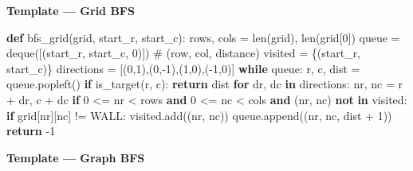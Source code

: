 \documentclass[11pt]{article}
\newenvironment{Shaded}{\begin{snugshade}}{\end{snugshade}}
\newcommand{\BuiltInTok}[1]{\textcolor[rgb]{0.50,0.55,0.55}{#1}}
\newcommand{\CommentTok}[1]{\textcolor[rgb]{0.48,0.49,0.49}{#1}}
\newcommand{\ControlFlowTok}[1]{\textcolor[rgb]{0.99,0.74,0.29}{\textbf{#1}}}
\newcommand{\DecValTok}[1]{\textcolor[rgb]{0.96,0.45,0.00}{#1}}
\newcommand{\KeywordTok}[1]{\textcolor[rgb]{0.81,0.81,0.76}{\textbf{#1}}}
\newcommand{\NormalTok}[1]{\textcolor[rgb]{0.81,0.81,0.76}{#1}}
\newcommand{\OperatorTok}[1]{\textcolor[rgb]{0.81,0.81,0.76}{#1}}
\begin{document}
\textbf{Template --- Grid BFS}


\begin{Shaded}
\begin{Highlighting}[]
\KeywordTok{def}\NormalTok{ bfs\_grid(grid, start\_r, start\_c):}
\NormalTok{    rows, cols }\OperatorTok{=} \BuiltInTok{len}\NormalTok{(grid), }\BuiltInTok{len}\NormalTok{(grid[}\DecValTok{0}\NormalTok{])}
\NormalTok{    queue }\OperatorTok{=}\NormalTok{ deque([(start\_r, start\_c, }\DecValTok{0}\NormalTok{)])   }\CommentTok{\# (row, col, distance)}
\NormalTok{    visited }\OperatorTok{=}\NormalTok{ \{(start\_r, start\_c)\}}
\NormalTok{    directions }\OperatorTok{=}\NormalTok{ [(}\DecValTok{0}\NormalTok{,}\DecValTok{1}\NormalTok{),(}\DecValTok{0}\NormalTok{,}\OperatorTok{{-}}\DecValTok{1}\NormalTok{),(}\DecValTok{1}\NormalTok{,}\DecValTok{0}\NormalTok{),(}\OperatorTok{{-}}\DecValTok{1}\NormalTok{,}\DecValTok{0}\NormalTok{)]}
    \ControlFlowTok{while}\NormalTok{ queue:}
\NormalTok{        r, c, dist }\OperatorTok{=}\NormalTok{ queue.popleft()}
        \ControlFlowTok{if}\NormalTok{ is\_target(r, c):}
            \ControlFlowTok{return}\NormalTok{ dist}
        \ControlFlowTok{for}\NormalTok{ dr, dc }\KeywordTok{in}\NormalTok{ directions:}
\NormalTok{            nr, nc }\OperatorTok{=}\NormalTok{ r }\OperatorTok{+}\NormalTok{ dr, c }\OperatorTok{+}\NormalTok{ dc}
            \ControlFlowTok{if} \DecValTok{0} \OperatorTok{\textless{}=}\NormalTok{ nr }\OperatorTok{\textless{}}\NormalTok{ rows }\KeywordTok{and} \DecValTok{0} \OperatorTok{\textless{}=}\NormalTok{ nc }\OperatorTok{\textless{}}\NormalTok{ cols }\KeywordTok{and}\NormalTok{ (nr, nc) }\KeywordTok{not} \KeywordTok{in}\NormalTok{ visited:}
                \ControlFlowTok{if}\NormalTok{ grid[nr][nc] }\OperatorTok{!=}\NormalTok{ WALL:}
\NormalTok{                    visited.add((nr, nc))}
\NormalTok{                    queue.append((nr, nc, dist }\OperatorTok{+} \DecValTok{1}\NormalTok{))}
    \ControlFlowTok{return} \OperatorTok{{-}}\DecValTok{1}
\end{Highlighting}
\end{Shaded}

\textbf{Template --- Graph BFS}

\end{document}
